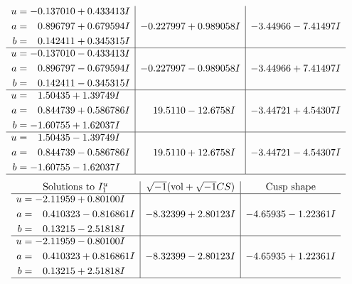 \documentclass[1p]{elsarticle_modified}
\theoremstyle{definition}
\newcommand{\I}{\sqrt{-1}}
\begin{document}
$$\begin{array}{c|c|c}
\begin{aligned}
u &= -0.137010 + 0.433413 I \\
a &= \phantom{-}0.896797 + 0.679594 I \\
b &= \phantom{-}0.142411 + 0.345315 I\end{aligned}
 & -0.227997 + 0.989058 I & -3.44966 - 7.41497 I \\ \hline\begin{aligned}
u &= -0.137010 - 0.433413 I \\
a &= \phantom{-}0.896797 - 0.679594 I \\
b &= \phantom{-}0.142411 - 0.345315 I\end{aligned}
 & -0.227997 - 0.989058 I & -3.44966 + 7.41497 I \\ \hline\begin{aligned}
u &= \phantom{-}1.50435 + 1.39749 I \\
a &= \phantom{-}0.844739 + 0.586786 I \\
b &= -1.60755 + 1.62037 I\end{aligned}
 & \phantom{-}19.5110 - 12.6758 I & -3.44721 + 4.54307 I \\ \hline\begin{aligned}
u &= \phantom{-}1.50435 - 1.39749 I \\
a &= \phantom{-}0.844739 - 0.586786 I \\
b &= -1.60755 - 1.62037 I\end{aligned}
 & \phantom{-}19.5110 + 12.6758 I & -3.44721 - 4.54307 I\\
 \hline 
 \end{array}$$\newpage$$\begin{array}{c|c|c}  
\text{Solutions to }I^u_{1}& \I (\text{vol} + \sqrt{-1}CS) & \text{Cusp shape}\\
 \hline 
\begin{aligned}
u &= -2.11959 + 0.80100 I \\
a &= \phantom{-}0.410323 - 0.816861 I \\
b &= \phantom{-}0.13215 - 2.51818 I\end{aligned}
 & -8.32399 + 2.80123 I & -4.65935 - 1.22361 I \\ \hline\begin{aligned}
u &= -2.11959 - 0.80100 I \\
a &= \phantom{-}0.410323 + 0.816861 I \\
b &= \phantom{-}0.13215 + 2.51818 I\end{aligned}
 & -8.32399 - 2.80123 I & -4.65935 + 1.22361 I\\
 \hline 
 \end{array}$$\newpage\newpage\renewcommand{\arraystretch}{1}
\end{document}
